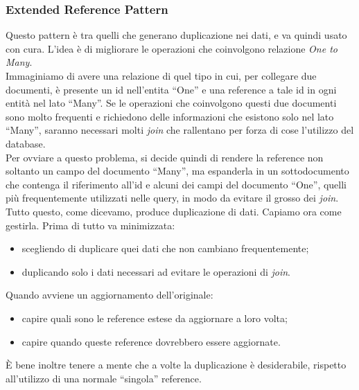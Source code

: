 \subsubsection{Extended Reference Pattern}
Questo pattern è tra quelli che generano duplicazione nei dati, e va quindi usato con cura.
L'idea è di migliorare le operazioni che coinvolgono relazione \textit{One to Many}.\\
Immaginiamo di avere una relazione di quel tipo in cui, per collegare due documenti, è presente un id nell'entita ``One'' e una reference a tale id in ogni entità nel lato ``Many''. Se le operazioni che coinvolgono questi due documenti sono molto frequenti e richiedono delle informazioni che esistono solo nel lato ``Many'', saranno necessari molti \textit{join} che rallentano per forza di cose l'utilizzo del database.\\
Per ovviare a questo problema, si decide quindi di rendere la reference non soltanto un campo del documento ``Many'', ma espanderla in un sottodocumento che contenga il riferimento all'id e alcuni dei campi del documento ``One'', quelli più frequentemente utilizzati nelle query, in modo da evitare il grosso dei \textit{join}.\\
Tutto questo, come dicevamo, produce duplicazione di dati. Capiamo ora come gestirla.
Prima di tutto va minimizzata:
\begin{itemize}
    \item scegliendo di duplicare quei dati che non cambiano frequentemente;
    \item duplicando solo i dati necessari ad evitare le operazioni di \textit{join}.
\end{itemize}
\noindent Quando avviene un aggiornamento dell'originale:
\begin{itemize}
    \item capire quali sono le reference estese da aggiornare a loro volta;
    \item capire quando queste reference dovrebbero essere aggiornate.
\end{itemize}
\noindent È bene inoltre tenere a mente che a volte la duplicazione è desiderabile, rispetto all'utilizzo di una normale ``singola'' reference.

